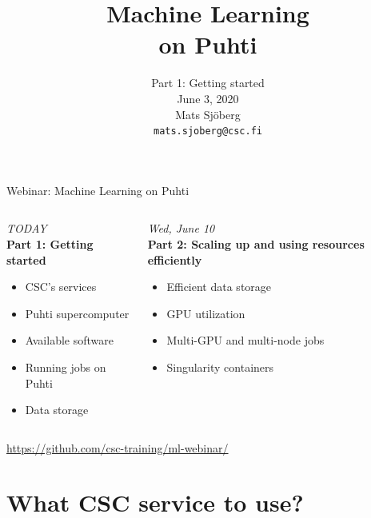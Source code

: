 \documentclass[aspectratio=1610,14pt]{beamer}
\title{Machine Learning\\on Puhti}
\subtitle{Part 1: Getting started\\[5mm]
  June 3, 2020\\
  Mats Sjöberg\\
  {\tt\small mats.sjoberg@csc.fi}}
\newcommand{\link}[1]{\alert{\url{#1}}}
\begin{document}
\begin{frame}{Webinar: Machine Learning on Puhti}
  \begin{columns}[t]
    \begin{column}{0.45\linewidth}
      \vfill
      \hspace{15mm} \alert{\em TODAY} \\[5mm]

      \textbf{Part 1: Getting started}
      
      \begin{itemize}
      \item CSC's services
      \item Puhti supercomputer
      \item Available software
      \item Running jobs on Puhti
      \item Data storage
      \end{itemize}
    \end{column}
    \begin{column}{0.55\linewidth}
      \vfill
      \hspace{12mm} {\em Wed, June 10} \\[5mm]
      
      \textbf{Part 2: Scaling up and using resources efficiently}
      
      \begin{itemize}
      \item Efficient data storage
      \item GPU utilization
      \item Multi-GPU and multi-node jobs
      \item Singularity containers
      \end{itemize}
    \end{column}
  \end{columns}
  \vspace{10mm}
  \link{https://github.com/csc-training/ml-webinar/}
\end{frame}

\section{What CSC service to use?}

\end{document}
